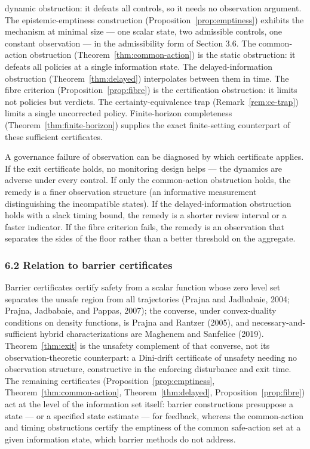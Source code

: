 \documentclass[10pt,twocolumn]{article}
\theoremstyle{definition}
\begin{document}
dynamic obstruction: it defeats all controls, so it needs no observation
argument. The epistemic-emptiness construction (Proposition~\ref{prop:emptiness}) exhibits the
mechanism at minimal size --- one scalar state, two admissible controls,
one constant observation --- in the admissibility form of Section 3.6. The common-action obstruction (Theorem~\ref{thm:common-action}) is the static
obstruction: it defeats all policies at a single information state. The
delayed-information obstruction (Theorem~\ref{thm:delayed}) interpolates between them in
time. The fibre criterion (Proposition~\ref{prop:fibre}) is the certification obstruction:
it limits not policies but verdicts. The certainty-equivalence trap
(Remark~\ref{rem:ce-trap}) limits a single uncorrected policy. Finite-horizon completeness
(Theorem~\ref{thm:finite-horizon}) supplies the exact finite-setting
counterpart of these sufficient certificates.

A governance failure of observation can be diagnosed by which
certificate applies. If the exit certificate holds, no monitoring design
helps --- the dynamics are adverse under every control. If only the
common-action obstruction holds, the remedy is a finer observation
structure (an informative measurement distinguishing the incompatible
states). If the delayed-information obstruction holds with a slack
timing bound, the remedy is a shorter review interval or a faster
indicator. If the fibre criterion fails, the remedy is an observation
that separates the sides of the floor rather than a better threshold on
the aggregate.

\subsubsection{6.2 Relation to barrier
certificates}\label{relation-to-barrier-certificates}

Barrier certificates certify safety from a scalar function whose zero level set separates the unsafe region from all trajectories (Prajna and Jadbabaie, 2004; Prajna, Jadbabaie, and Pappas, 2007); the converse, under convex-duality conditions on density functions, is Prajna and Rantzer (2005), and necessary-and-sufficient hybrid characterizations are Maghenem and Sanfelice (2019). Theorem~\ref{thm:exit} is the unsafety complement of that converse, not its observation-theoretic counterpart: a Dini-drift certificate of unsafety needing no observation structure, constructive in the enforcing disturbance and exit time. The remaining certificates (Proposition~\ref{prop:emptiness}, Theorem~\ref{thm:common-action}, Theorem~\ref{thm:delayed}, Proposition~\ref{prop:fibre}) act at the level of the information set itself: barrier constructions presuppose a state --- or a specified state estimate --- for feedback, whereas the common-action and timing obstructions certify the emptiness of the common safe-action set at a given information state, which barrier methods do not address.
\end{document}
